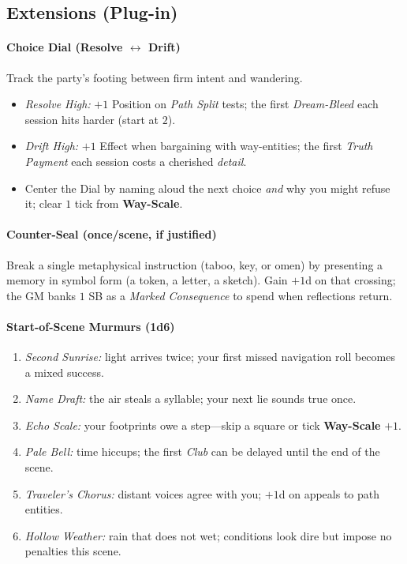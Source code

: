 \subsection*{Extensions (Plug-in)}
\label{sec:ways-between-extensions}

\paragraph{Choice Dial (Resolve $\leftrightarrow$ Drift)}
Track the party's footing between firm intent and wandering.
\begin{itemize}
  \item \emph{Resolve High:} $+1$ Position on \emph{Path Split} tests; the first \emph{Dream-Bleed} each session hits harder (start at $2$).
  \item \emph{Drift High:} $+1$ Effect when bargaining with way-entities; the first \emph{Truth Payment} each session costs a cherished \emph{detail}.
  \item Center the Dial by naming aloud the next choice \emph{and} why you might refuse it; clear $1$ tick from \textbf{Way-Scale}.
\end{itemize}

\paragraph{Counter-Seal (once/scene, if justified)}
Break a single metaphysical instruction (taboo, key, or omen) by presenting a memory in symbol form (a token, a letter, a sketch). Gain $+1$d on that crossing; the GM banks $1$ SB as a \emph{Marked Consequence} to spend when reflections return.

\paragraph{Start-of-Scene Murmurs (1d6)}
\begin{enumerate}
  \item \emph{Second Sunrise:} light arrives twice; your first missed navigation roll becomes a mixed success.
  \item \emph{Name Draft:} the air steals a syllable; your next lie sounds true once.
  \item \emph{Echo Scale:} your footprints owe a step---skip a square or tick \textbf{Way-Scale} $+1$.
  \item \emph{Pale Bell:} time hiccups; the first \emph{Club} can be delayed until the end of the scene.
  \item \emph{Traveler's Chorus:} distant voices agree with you; $+1$d on appeals to path entities.
  \item \emph{Hollow Weather:} rain that does not wet; conditions look dire but impose no penalties this scene.
\end{enumerate}

